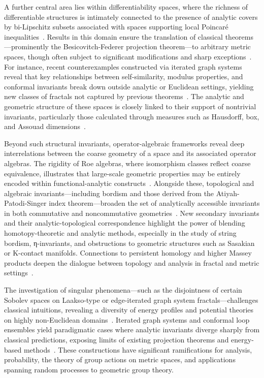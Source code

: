 \documentclass[sigconf]{acmart}
\begin{document}
A further central area lies within differentiability spaces, where the richness of differentiable structures is intimately connected to the presence of analytic covers by bi-Lipschitz subsets associated with spaces supporting local Poincaré inequalities~\cite{ref6,ref93}. Results in this domain ensure the translation of classical theorems—prominently the Besicovitch-Federer projection theorem—to arbitrary metric spaces, though often subject to significant modifications and sharp exceptions~\cite{ref11,ref43}. For instance, recent counterexamples constructed via iterated graph systems reveal that key relationships between self-similarity, modulus properties, and conformal invariants break down outside analytic or Euclidean settings, yielding new classes of fractals not captured by previous theorems~\cite{ref11}. The analytic and geometric structure of these spaces is closely linked to their support of nontrivial invariants, particularly those calculated through measures such as Hausdorff, box, and Assouad dimensions~\cite{ref2,ref3,ref21,ref27,ref39,ref43,ref52,ref30}. 

Beyond such structural invariants, operator-algebraic frameworks reveal deep interrelations between the coarse geometry of a space and its associated operator algebras. The rigidity of Roe algebras, where isomorphism classes reflect coarse equivalence, illustrates that large-scale geometric properties may be entirely encoded within functional-analytic constructs~\cite{ref52}. Alongside these, topological and algebraic invariants—including bordism and those derived from the Atiyah-Patodi-Singer index theorem—broaden the set of analytically accessible invariants in both commutative and noncommutative geometries~\cite{ref82,ref14}. New secondary invariants and their analytic-topological correspondence highlight the power of blending homotopy-theoretic and analytic methods, especially in the study of string bordism, η-invariants, and obstructions to geometric structures such as Sasakian or K-contact manifolds. Connections to persistent homology and higher Massey products deepen the dialogue between topology and analysis in fractal and metric settings~\cite{ref21,ref14}.

The investigation of singular phenomena—such as the disjointness of certain Sobolev spaces on Laakso-type or edge-iterated graph system fractals—challenges classical intuitions, revealing a diversity of energy profiles and potential theories on highly non-Euclidean domains~\cite{ref30,ref35,ref11}. Iterated graph systems and conformal loop ensembles yield paradigmatic cases where analytic invariants diverge sharply from classical predictions, exposing limits of existing projection theorems and energy-based methods~\cite{ref11,ref35}. These constructions have significant ramifications for analysis, probability, the theory of group actions on metric spaces, and applications spanning random processes to geometric group theory.
\end{document}
